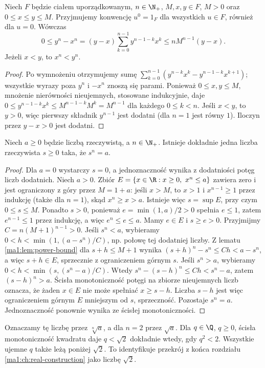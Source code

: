 \begin{lemat}
\label{ma1:lem:power-bound}
Niech $F$ będzie ciałem uporządkowanym, $n\in\N_+$, $M,x,y\in F$, $M>0$ oraz $0\le x\le y\le M$. Przyjmujemy konwencję $u^0=1_F$ dla wszystkich $u\in F$, również dla $u=0$. Wówczas
\[
 0\le y^n-x^n=(y-x)\sum_{k=0}^{n-1}y^{n-1-k}x^k
 \le nM^{n-1}(y-x).
\]
Jeżeli $x<y$, to $x^n<y^n$.
\end{lemat}
\begin{proof}
Po wymnożeniu otrzymujemy sumę $\sum_{k=0}^{n-1}(y^{n-k}x^k-y^{n-1-k}x^{k+1})$; wszystkie wyrazy poza $y^n$ i $-x^n$ znoszą się parami. Ponieważ $0\le x,y\le M$, mnożenie nierówności nieujemnych, stosowane indukcyjnie, daje $0\le y^{n-1-k}x^k\le M^{n-1-k}M^k=M^{n-1}$ dla każdego $0\le k<n$. Jeśli $x<y$, to $y>0$, więc pierwszy składnik $y^{n-1}$ jest dodatni (dla $n=1$ jest równy $1$). Iloczyn przez $y-x>0$ jest dodatni.
\end{proof}
\begin{twierdzenie}
\label{ma1:thm:positive-root}
Niech $a\ge0$ będzie liczbą rzeczywistą, a $n\in\N_+$. Istnieje dokładnie jedna liczba rzeczywista $s\ge0$ taka, że $s^n=a$.
\end{twierdzenie}
\begin{proof}
Dla $a=0$ wystarczy $s=0$, a jednoznaczność wynika z dodatniości potęg liczb dodatnich. Niech $a>0$. Zbiór $E=\{x\in\R:x\ge0,\ x^n\le a\}$ zawiera zero i jest ograniczony z góry przez $M=1+a$: jeśli $x>M$, to $x>1$ i $x^{n-1}\ge1$ przez indukcję (także dla $n=1$), skąd $x^n\ge x>a$. Istnieje więc $s=\sup E$, przy czym $0\le s\le M$. Ponadto $s>0$, ponieważ $e=\min(1,a)/2>0$ spełnia $e\le1$, zatem $e^{n-1}\le1$ przez indukcję, a więc $e^n\le e\le a$. Mamy $e\in E$ i $s\ge e>0$.
Przyjmijmy $C=n(M+1)^{n-1}>0$. Jeśli $s^n<a$, wybieramy $0<h<\min(1,(a-s^n)/C)$, np. połowę tej dodatniej liczby. Z lematu \ref{ma1:lem:power-bound} dla $s+h\le M+1$ wynika
$(s+h)^n-s^n\le Ch<a-s^n$, a więc $s+h\in E$, sprzecznie z ograniczeniem górnym $s$.
Jeśli $s^n>a$, wybieramy $0<h<\min(s,(s^n-a)/C)$. Wtedy $s^n-(s-h)^n\le Ch<s^n-a$, zatem $(s-h)^n>a$. Ścisła monotoniczność potęgi na zbiorze nieujemnych liczb oznacza, że żaden $x\in E$ nie może spełniać $x\ge s-h$. Liczba $s-h$ jest więc ograniczeniem górnym $E$ mniejszym od $s$, sprzeczność. Pozostaje $s^n=a$. Jednoznaczność ponownie wynika ze ścisłej monotoniczności.
\end{proof}
Oznaczamy tę liczbę przez $\sqrt[n]{a}$, a dla $n=2$ przez $\sqrt a$. Dla $q\in\Q$, $q\ge0$, ścisła monotoniczność kwadratu daje $q<\sqrt2$ dokładnie wtedy, gdy $q^2<2$. Wszystkie ujemne $q$ także leżą poniżej $\sqrt2$. To identyfikuje przekrój z końca rozdziału \ref{ma1:ch:real-construction} jako liczbę $\sqrt2$.
